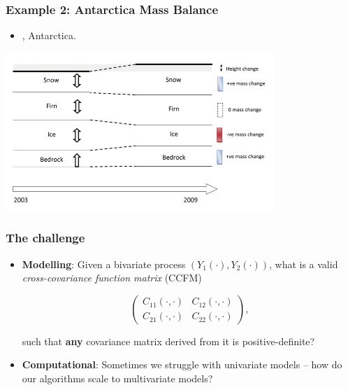 \documentclass{beamer}
\begin{document}

\begin{frame}
\frametitle{Example 2: Antarctica Mass Balance}

\begin{itemize}
\item \citet{Zammit_2014,Zammit_2015a,Zammit_2015b}, Antarctica.
\end{itemize}


\begin{center}
\includegraphics[width=4in]{./Obs.png}        
\end{center}

\end{frame}


\begin{frame}
\frametitle{The challenge}

\begin{itemize}

\item {\bf Modelling}: Given a bivariate process $(Y_1(\cdot), Y_2(\cdot))$, what is a valid \emph{cross-covariance function matrix} (CCFM)
  
\begin{equation}
\left(\begin{array}{cc} C_{11}(\cdot,\cdot) & C_{12}(\cdot,\cdot) \\ C_{21}(\cdot,\cdot) & C_{22}(\cdot,\cdot)\end{array} \right),
\end{equation} 

such that {\bf any} covariance matrix derived from it is positive-definite? \vfill

\item {\bf Computational}: Sometimes we struggle with univariate models -- how do our algorithms scale to multivariate models? \vfill
\end{itemize}
\end{frame}
\end{document}
